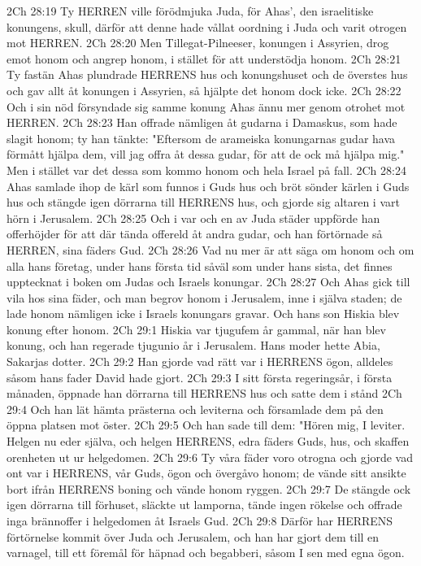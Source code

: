 2Ch 28:19  Ty HERREN ville förödmjuka Juda, för Ahas', den israelitiske konungens, skull, därför att denne hade vållat oordning i Juda och varit otrogen mot HERREN.
2Ch 28:20  Men Tillegat-Pilneeser, konungen i Assyrien, drog emot honom och angrep honom, i stället för att understödja honom.
2Ch 28:21  Ty fastän Ahas plundrade HERRENS hus och konungshuset och de överstes hus och gav allt åt konungen i Assyrien, så hjälpte det honom dock icke.
2Ch 28:22  Och i sin nöd försyndade sig samme konung Ahas ännu mer genom otrohet mot HERREN.
2Ch 28:23  Han offrade nämligen åt gudarna i Damaskus, som hade slagit honom; ty han tänkte: "Eftersom de arameiska konungarnas gudar hava förmått hjälpa dem, vill jag offra åt dessa gudar, för att de ock må hjälpa mig." Men i stället var det dessa som kommo honom och hela Israel på fall.
2Ch 28:24  Ahas samlade ihop de kärl som funnos i Guds hus och bröt sönder kärlen i Guds hus och stängde igen dörrarna till HERRENS hus, och gjorde sig altaren i vart hörn i Jerusalem.
2Ch 28:25  Och i var och en av Juda städer uppförde han offerhöjder för att där tända offereld åt andra gudar, och han förtörnade så HERREN, sina fäders Gud.
2Ch 28:26  Vad nu mer är att säga om honom och om alla hans företag, under hans första tid såväl som under hans sista, det finnes upptecknat i boken om Judas och Israels konungar.
2Ch 28:27  Och Ahas gick till vila hos sina fäder, och man begrov honom i Jerusalem, inne i själva staden; de lade honom nämligen icke i Israels konungars gravar. Och hans son Hiskia blev konung efter honom.
2Ch 29:1  Hiskia var tjugufem år gammal, när han blev konung, och han regerade tjugunio år i Jerusalem. Hans moder hette Abia, Sakarjas dotter.
2Ch 29:2  Han gjorde vad rätt var i HERRENS ögon, alldeles såsom hans fader David hade gjort.
2Ch 29:3  I sitt första regeringsår, i första månaden, öppnade han dörrarna till HERRENS hus och satte dem i stånd
2Ch 29:4  Och han lät hämta prästerna och leviterna och församlade dem på den öppna platsen mot öster.
2Ch 29:5  Och han sade till dem: "Hören mig, I leviter. Helgen nu eder själva, och helgen HERRENS, edra fäders Guds, hus, och skaffen orenheten ut ur helgedomen.
2Ch 29:6  Ty våra fäder voro otrogna och gjorde vad ont var i HERRENS, vår Guds, ögon och övergåvo honom; de vände sitt ansikte bort ifrån HERRENS boning och vände honom ryggen.
2Ch 29:7  De stängde ock igen dörrarna till förhuset, släckte ut lamporna, tände ingen rökelse och offrade inga brännoffer i helgedomen åt Israels Gud.
2Ch 29:8  Därför har HERRENS förtörnelse kommit över Juda och Jerusalem, och han har gjort dem till en varnagel, till ett föremål för häpnad och begabberi, såsom I sen med egna ögon.
